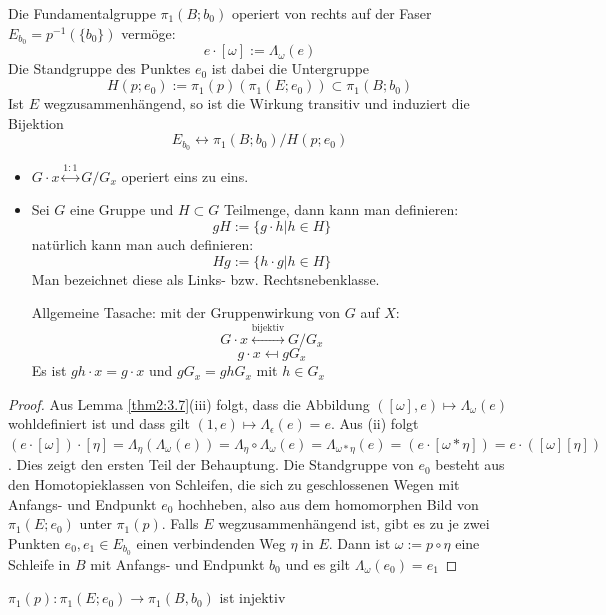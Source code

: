 \documentclass[a4paper,10pt]{scrartcl}
\begin{document}
\begin{st}\label{thm2:3.8}
 Die Fundamentalgruppe $\pi_1(B; b_0)$ operiert von rechts auf der Faser $E_{b_0}=p^{-1}(\{b_0\})$ vermöge:
\[
 e\cdot [\omega] := \Lambda_\omega(e)
\]
Die Standgruppe des Punktes $e_0$ ist dabei die Untergruppe
\[
 H(p;e_0):=\pi_1(p) (\pi_1(E;e_0))\subset \pi_1(B;b_0)
\]
Ist $E$ wegzusammenhängend, so ist die Wirkung transitiv und induziert die Bijektion
\[
 E_{b_0} \leftrightarrow \pi_1(B; b_0) / H(p; e_0)
\]



\end{st}
\begin{note*}
\begin{itemize}
\item $G\cdot x \stackrel{1:1}{\leftrightarrow} G/G_x$ operiert eins zu eins.
\item Sei $G$ eine Gruppe und $H \subset G$ Teilmenge, dann kann man definieren:
\[
 gH:=\{g\cdot h|h \in H\}
\]
natürlich kann man auch definieren:
\[
 Hg:=\{h\cdot g|h\in H\}
\]
Man bezeichnet diese als Links- bzw. Rechtsnebenklasse.

\begin{seg}{Allgemeine Tasache:}
 mit der Gruppenwirkung von $G$ auf $X$:
\[
 G\cdot x \stackrel{\text{bijektiv}}{\longleftrightarrow} G/G_x
\]
\[
 g\cdot x \mapsfrom gG_x
\]
Es ist $gh\cdot x=g\cdot x$ und $gG_x=ghG_x$ mit $h\in G_x$
\end{seg}
\end{itemize}
\end{note*}
\begin{proof}
 Aus Lemma \ref{thm2:3.7}(iii) folgt, dass die Abbildung $([\omega], e)\mapsto \Lambda_\omega(e)$ wohldefiniert ist und dass gilt $(1,e) \mapsto \Lambda_\epsilon(e)=e$. Aus (ii) folgt $(e\cdot [\omega])\cdot [\eta]=\Lambda_{\eta}(\Lambda_\omega(e))=\Lambda_{\eta}\circ \Lambda_{\omega}(e)=\Lambda_{\omega*\eta}(e)=(e\cdot [\omega*\eta])=e\cdot ([\omega][\eta])$. Dies zeigt den ersten Teil der Behauptung. Die Standgruppe von $e_0$ besteht aus den Homotopieklassen von Schleifen, die sich zu geschlossenen Wegen mit Anfangs- und Endpunkt $e_0$ hochheben, also aus dem homomorphen Bild von $\pi_1(E; e_0)$ unter $\pi_1(p)$. Falls $E$ wegzusammenhängend ist, gibt es zu je zwei Punkten $e_0, e_1 \in E_{b_0}$ einen verbindenden Weg $\eta$ in $E$. Dann ist $\omega:= p \circ \eta$ eine Schleife in $B$ mit Anfangs- und Endpunkt $b_0$ und es gilt $\Lambda_{\omega}(e_0)=e_1$
\end{proof}
\begin{kor}\label{thm2:3.9}
 $\pi_1(p): \pi_1(E; e_0)\to \pi_1(B, b_0)$ ist injektiv
\end{kor}
\end{document}
